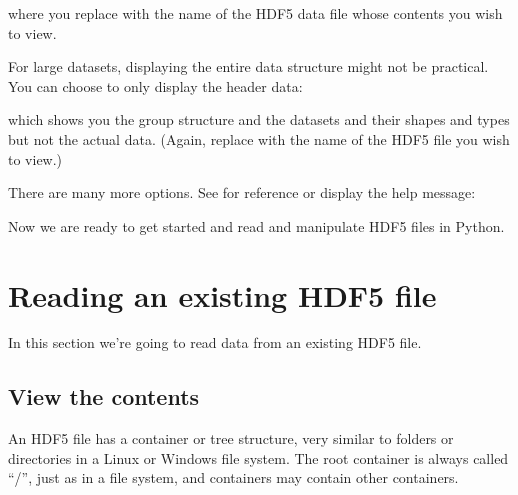 \documentclass[letterpaper,10pt,english]{sphinxmanual}
\begin{document}
\begin{sphinxVerbatim}[commandchars=\\\{\}]
 
\end{sphinxVerbatim}

\sphinxAtStartPar
where you replace  with the name of the HDF5 data file whose contents you wish to view.

\sphinxAtStartPar
For large datasets, displaying the entire data structure might not be practical.
You can choose to only display the header data:

\begin{sphinxVerbatim}[commandchars=\\\{\}]
  
\end{sphinxVerbatim}

\sphinxAtStartPar
which shows you the group structure and the datasets and their shapes and types but not the actual data.
(Again, replace  with the name of the HDF5 file you wish to view.)

\sphinxAtStartPar
There are many more options. See  for reference or display the help message:

\begin{sphinxVerbatim}[commandchars=\\\{\}]
 
\end{sphinxVerbatim}

\sphinxAtStartPar
Now we are ready to get started and read and manipulate HDF5 files in Python.


\chapter{Reading an existing HDF5 file}
\label{\detokenize{index:reading-an-existing-hdf5-file}}
\sphinxAtStartPar
In this section we’re going to read data from an existing HDF5 file.


\section{View the contents}
\label{\detokenize{index:view-the-contents}}
\sphinxAtStartPar
An HDF5 file has a container or tree structure, very similar to folders or directories in a Linux or Windows file system. The root container is always called “/”, just as in a file system, and containers may contain other containers.
\end{document}

